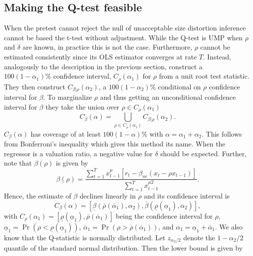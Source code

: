 \documentclass{article}
\begin{document}
\subsection{Making the Q-test feasible}
\label{Making the Q-test feasible}
When the pretest cannot reject the null of unacceptable size distortion inference cannot be based the t-test without adjustment. While the Q-test is UMP when $\rho$ and $\delta$ are known, in practice this is not the case. Furthermore, $\rho$ cannot be estimated consistently since its OLS estimator converges at rate $T$. Instead, analogously to the description in the previous section, \citet{campbell2006efficient} construct a $100\left(1-\alpha_{1}\right) \%$ confidence interval, $C_{\rho}\left(\alpha_{1}\right)$ for $\rho$ from a unit root test statistic. They then construct $C_{\beta | \rho}\left(\alpha_{2}\right)$, a $100\left(1-\alpha_{2}\right) \%$ conditional on $\rho$ confidence interval for $\beta$. To marginalize $\rho$ and thus getting an unconditional confidence interval for $\beta$ they take the union over $\rho \in C_{\rho}\left(\alpha_{1}\right)$
\begin{equation}
C_{\beta}(\alpha)=\bigcup_{\rho \in C_{\rho}\left(\alpha_{1}\right)} C_{\beta | \rho}\left(\alpha_{2}\right).
\end{equation}
$C_{\beta}(\alpha)$ has coverage of at least $100(1-\alpha) \%$ with $\alpha=\alpha_{1}+\alpha_{2}$. This follows from Bonferroni's inequality which gives this method its name.  
When the regressor is a valuation ratio, a negative value for $\delta$ should be expected. Further, note that $\beta(\rho)$ is given by 
\begin{equation}
\beta(\rho)=\frac{\sum_{t=1}^{T} x_{t-1}^{\mu}\left[r_{t}-\beta_{u e}\left(x_{t}-\rho x_{t-1}\right)\right]}{\sum_{t=1}^{T} x_{t-1}^{\mu 2}}.
\end{equation}
Hence, the estimate of $\beta$ declines linearly in $\rho$ and its confidence interval is 
\begin{equation}
C_{\beta}(\alpha)=\left[\underline{\beta}\left(\overline{\rho}\left(\overline{\alpha}_{1}\right), \alpha_{2}\right), \overline{\beta}\left(\underline{\rho}\left(\underline{\alpha}_{1}\right), \alpha_{2}\right)\right],
\end{equation}
with $C_{\rho}\left(\alpha_{1}\right)= \left[\underline{\rho}\left(\underline{\alpha}_{1}\right), \overline{\rho}\left(\overline{\alpha}_{1}\right)\right]$ being the confidence interval for $\rho$, $\underline{\alpha}_{1}=\operatorname{Pr}\left(\rho<\underline{\rho}\left(\underline{\alpha}_{1}\right)\right)$, $\overline{\alpha}_{1}=\operatorname{Pr}\left(\rho>\overline{\rho}\left(\overline{\alpha}_{1}\right)\right)$, and $\alpha_{1}=\underline{\alpha}_{1}+\overline{\alpha}_{1}$. We also know that the Q-statistic is normally distributed. Let $z_{\alpha_{2} / 2}$ denote the $1-\alpha_{2} / 2$ quantile of the standard normal distribution. Then the lower bound is given by
\end{document}
